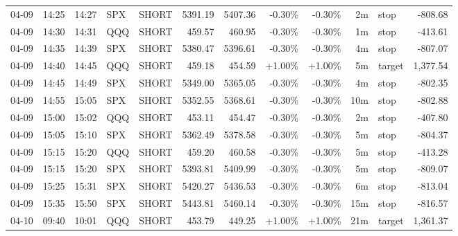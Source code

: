 \documentclass[11pt,a4paper,twoside]{article}
\begin{document}
\begin{center}
\begin{longtable}{>{\color{txtmain}}l l l l l r r r r r >{\color{txtmain}}l r}
04-09 & 14:25 & 14:27 & SPX & SHORT & 5391.19 & 5407.36 & \textcolor{lossred}{-0.30\%} & \textcolor{lossred}{-0.30\%} & 2m & stop & \textcolor{lossred}{-808.68} \\
04-09 & 14:30 & 14:31 & QQQ & SHORT & 459.57 & 460.95 & \textcolor{lossred}{-0.30\%} & \textcolor{lossred}{-0.30\%} & 1m & stop & \textcolor{lossred}{-413.61} \\
04-09 & 14:35 & 14:39 & SPX & SHORT & 5380.47 & 5396.61 & \textcolor{lossred}{-0.30\%} & \textcolor{lossred}{-0.30\%} & 4m & stop & \textcolor{lossred}{-807.07} \\
04-09 & 14:40 & 14:45 & QQQ & SHORT & 459.18 & 454.59 & \textcolor{wingreen}{+1.00\%} & \textcolor{wingreen}{+1.00\%} & 5m & target & \textcolor{wingreen}{1,377.54} \\
04-09 & 14:45 & 14:49 & SPX & SHORT & 5349.00 & 5365.05 & \textcolor{lossred}{-0.30\%} & \textcolor{lossred}{-0.30\%} & 4m & stop & \textcolor{lossred}{-802.35} \\
04-09 & 14:55 & 15:05 & SPX & SHORT & 5352.55 & 5368.61 & \textcolor{lossred}{-0.30\%} & \textcolor{lossred}{-0.30\%} & 10m & stop & \textcolor{lossred}{-802.88} \\
04-09 & 15:00 & 15:02 & QQQ & SHORT & 453.11 & 454.47 & \textcolor{lossred}{-0.30\%} & \textcolor{lossred}{-0.30\%} & 2m & stop & \textcolor{lossred}{-407.80} \\
04-09 & 15:05 & 15:10 & SPX & SHORT & 5362.49 & 5378.58 & \textcolor{lossred}{-0.30\%} & \textcolor{lossred}{-0.30\%} & 5m & stop & \textcolor{lossred}{-804.37} \\
04-09 & 15:15 & 15:20 & QQQ & SHORT & 459.20 & 460.58 & \textcolor{lossred}{-0.30\%} & \textcolor{lossred}{-0.30\%} & 5m & stop & \textcolor{lossred}{-413.28} \\
04-09 & 15:15 & 15:20 & SPX & SHORT & 5393.81 & 5409.99 & \textcolor{lossred}{-0.30\%} & \textcolor{lossred}{-0.30\%} & 5m & stop & \textcolor{lossred}{-809.07} \\
04-09 & 15:25 & 15:31 & SPX & SHORT & 5420.27 & 5436.53 & \textcolor{lossred}{-0.30\%} & \textcolor{lossred}{-0.30\%} & 6m & stop & \textcolor{lossred}{-813.04} \\
04-09 & 15:35 & 15:50 & SPX & SHORT & 5443.81 & 5460.14 & \textcolor{lossred}{-0.30\%} & \textcolor{lossred}{-0.30\%} & 15m & stop & \textcolor{lossred}{-816.57} \\
04-10 & 09:40 & 10:01 & QQQ & SHORT & 453.79 & 449.25 & \textcolor{wingreen}{+1.00\%} & \textcolor{wingreen}{+1.00\%} & 21m & target & \textcolor{wingreen}{1,361.37} \\

\end{longtable}
\end{center}
\end{document}
